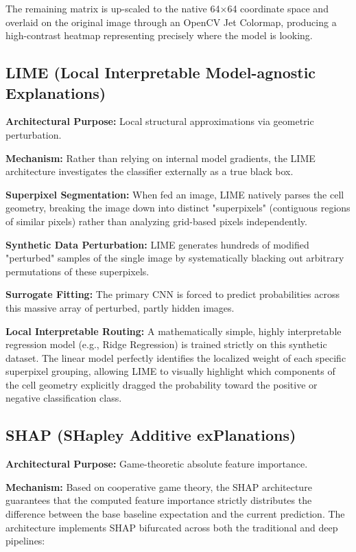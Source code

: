 The remaining matrix is up-scaled to the native 64$\times$64 coordinate space and overlaid on the original image through an OpenCV Jet Colormap, producing a high-contrast heatmap representing precisely where the model is looking.

\subsection{LIME (Local Interpretable Model-agnostic Explanations)}

\noindent\textbf{Architectural Purpose:} Local structural approximations via geometric perturbation.

\noindent\textbf{Mechanism:} Rather than relying on internal model gradients, the LIME architecture investigates the classifier externally as a true black box.

\noindent\textbf{Superpixel Segmentation:} When fed an image, LIME natively parses the cell geometry, breaking the image down into distinct "superpixels" (contiguous regions of similar pixels) rather than analyzing grid-based pixels independently.

\noindent\textbf{Synthetic Data Perturbation:} LIME generates hundreds of modified "perturbed" samples of the single image by systematically blacking out arbitrary permutations of these superpixels.

\noindent\textbf{Surrogate Fitting:} The primary CNN is forced to predict probabilities across this massive array of perturbed, partly hidden images.

\noindent\textbf{Local Interpretable Routing:} A mathematically simple, highly interpretable regression model (e.g., Ridge Regression) is trained strictly on this synthetic dataset. The linear model perfectly identifies the localized weight of each specific superpixel grouping, allowing LIME to visually highlight which components of the cell geometry explicitly dragged the probability toward the positive or negative classification class.

\subsection{SHAP (SHapley Additive exPlanations)}

\noindent\textbf{Architectural Purpose:} Game-theoretic absolute feature importance.

\noindent\textbf{Mechanism:} Based on cooperative game theory, the SHAP architecture guarantees that the computed feature importance strictly distributes the difference between the base baseline expectation and the current prediction. The architecture implements SHAP bifurcated across both the traditional and deep pipelines:

